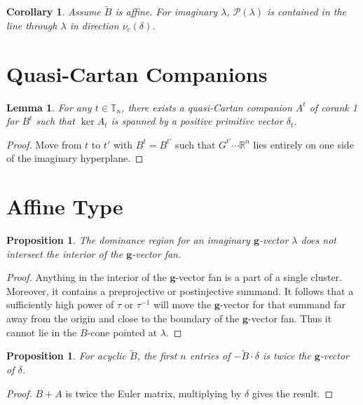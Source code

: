 \documentclass{amsart}
\newtheorem{corollary}[theorem]{Corollary}
\newtheorem{lemma}[theorem]{Lemma}
\newtheorem{proposition}[theorem]{Proposition}
\numberwithin{theorem}{section}
\newcommand{\bfg}{\boldsymbol{g}}
\newcommand{\cP}{\mathcal{P}}
\newcommand{\RR}{\mathbb{R}}
\newcommand{\TT}{\mathbb{T}}
\begin{document}
  \begin{corollary}
    Assume $\widetilde B$ is affine.
    For imaginary $\lambda$, $\cP(\lambda)$ is contained in the line through $\lambda$ in direction $\nu_c(\delta)$. 
  \end{corollary}


  \section{Quasi-Cartan Companions}

  \begin{lemma}
    For any $t\in\TT_n$, there exists a quasi-Cartan companion $A^t$ of corank 1 for $B^t$ such that $\ker A_t$ is spanned by a positive primitive vector $\delta_t$.
  \end{lemma}
  \begin{proof}
    Move from $t$ to $t'$ with $B^t=B^{t'}$ such that $G^{t'}\cdots\RR^n$ lies entirely on one side of the imaginary hyperplane.
  \end{proof}

  \section{Affine Type}
  
  \begin{proposition}
    The dominance region for an imaginary $\bfg$-vector $\lambda$ does not intersect the interior of the $\bfg$-vector fan.
  \end{proposition}
  \begin{proof}
    Anything in the interior of the $\bfg$-vector fan is a part of a single cluster.
    Moreover, it contains a preprojective or postinjective summand.
    It follows that a sufficiently high power of $\tau$ or $\tau^{-1}$ will move the $\bfg$-vector for that summand far away from the origin and close to the boundary of the $\bfg$-vector fan.
    Thus it cannot lie in the $B$-cone pointed at $\lambda$.
  \end{proof}

  \begin{proposition}
    For acyclic $\widetilde B$, the first $n$ entries of $-\widetilde B\cdot\delta$ is twice the $\bfg$-vector of $\delta$.
  \end{proposition}
  \begin{proof}
    $B+A$ is twice the Euler matrix, multiplying by $\delta$ gives the result.
  \end{proof}
\end{document}
